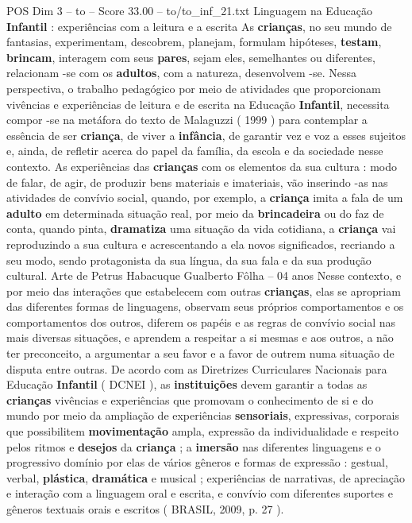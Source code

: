 \begin{textsample}{POS Dim 3 – to – Score 33.00 – to/to\_inf\_21.txt}  \label{ex:f3_pos_101}
Linguagem na Educação \textbf{Infantil} : experiências com a leitura e a escrita As \textbf{crianças}, no seu mundo de fantasias, experimentam, descobrem, planejam, formulam hipóteses, \textbf{testam}, \textbf{brincam}, interagem com seus \textbf{pares}, sejam eles, semelhantes ou diferentes, relacionam -se com os \textbf{adultos}, com a natureza, desenvolvem -se.
Nessa perspectiva, o trabalho pedagógico por meio de atividades que proporcionam vivências e experiências de leitura e de escrita na Educação \textbf{Infantil}, necessita compor -se na metáfora do texto de Malaguzzi ( 1999 ) para contemplar a essência de ser \textbf{criança}, de viver a \textbf{infância}, de garantir vez e voz a esses sujeitos e, ainda, de refletir acerca do papel da família, da escola e da sociedade nesse contexto.
As experiências das \textbf{crianças} com os elementos da sua cultura : modo de falar, de agir, de produzir bens materiais e imateriais, vão inserindo -as nas atividades de convívio social, quando, por exemplo, a \textbf{criança} imita a fala de um \textbf{adulto} em determinada situação real, por meio da \textbf{brincadeira} ou do faz de conta, quando pinta, \textbf{dramatiza} uma situação da vida cotidiana, a \textbf{criança} vai reproduzindo a sua cultura e acrescentando a ela novos significados, recriando a seu modo, sendo protagonista da sua língua, da sua fala e da sua produção cultural.
Arte de Petrus Habacuque Gualberto Fôlha – 04 anos Nesse contexto, e por meio das interações que estabelecem com outras \textbf{crianças}, elas se apropriam das diferentes formas de linguagens, observam seus próprios comportamentos e os comportamentos dos outros, diferem os papéis e as regras de convívio social nas mais diversas situações, e aprendem a respeitar a si mesmas e aos outros, a não ter preconceito, a argumentar a seu favor e a favor de outrem numa situação de disputa entre outras.
De acordo com as Diretrizes Curriculares Nacionais para Educação \textbf{Infantil} ( DCNEI ), as \textbf{instituições} devem garantir a todas as \textbf{crianças} vivências e experiências que promovam o conhecimento de si e do mundo por meio da ampliação de experiências \textbf{sensoriais}, expressivas, corporais que possibilitem \textbf{movimentação} ampla, expressão da individualidade e respeito pelos ritmos e \textbf{desejos} da \textbf{criança} ; a \textbf{imersão} nas diferentes linguagens e o progressivo domínio por elas de vários gêneros e formas de expressão : gestual, verbal, \textbf{plástica}, \textbf{dramática} e musical ; experiências de narrativas, de apreciação e interação com a linguagem oral e escrita, e convívio com diferentes suportes e gêneros textuais orais e escritos ( BRASIL, 2009, p. 27 ).

\end{textsample}
